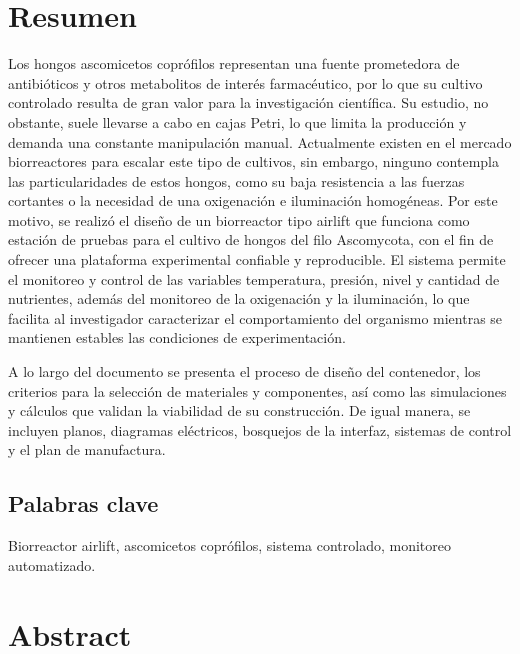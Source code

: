 {
\section*{Resumen}\label{resumen}
\thispagestyle{empty}
\let\clearpage\relax

Los hongos ascomicetos coprófilos representan una fuente prometedora de antibióticos y otros metabolitos de interés farmacéutico, por lo que su cultivo controlado resulta de gran valor para la investigación científica. Su estudio, no obstante, suele llevarse a cabo en cajas Petri, lo que limita la producción y demanda una constante manipulación manual. Actualmente existen en el mercado biorreactores para escalar este tipo de cultivos, sin embargo, ninguno contempla las particularidades de estos hongos, como su baja resistencia a las fuerzas cortantes o la necesidad de una oxigenación e iluminación homogéneas. Por este motivo, se realizó el diseño de un biorreactor tipo airlift que funciona como estación de pruebas para el cultivo de hongos del filo Ascomycota, con el fin de ofrecer una plataforma experimental confiable y reproducible. El sistema permite el monitoreo y control de las variables temperatura, presión, nivel y cantidad de nutrientes, además del monitoreo de la oxigenación y la iluminación, lo que facilita al investigador caracterizar el comportamiento del organismo mientras se mantienen estables las condiciones de experimentación.


A lo largo del documento se presenta el proceso de diseño del contenedor, los criterios para la selección de materiales y componentes, así como las simulaciones y cálculos que validan la viabilidad de su construcción. De igual manera, se incluyen planos, diagramas eléctricos, bosquejos de la interfaz, sistemas de control y el plan de manufactura.

\subsection*{Palabras clave}\label{palabras}

Biorreactor airlift, ascomicetos coprófilos, sistema controlado, monitoreo automatizado.

\newpage
\section*{Abstract}\label{abstract}

}
